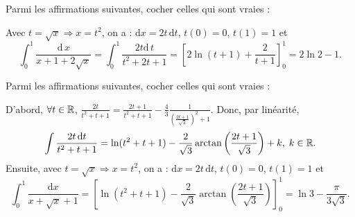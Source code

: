 \begin{question}
Parmi les affirmations suivantes, cocher celles qui sont vraies :
\begin{answers}
\bad{$\displaystyle \ln (t+1)+\frac{1}{t+1}$ est une primitive de $\displaystyle \frac{2t}{t^2+2t+1}$ sur $]-1,+\infty[$.}
\end{answers}
\vskip3mm
\begin{explanations}
Avec $t=\sqrt{x}\Rightarrow x=t^2$, on a : $\mathrm{d}x=2t\, \mathrm{d}t$, $t(0)=0$, $t(1)=1$ et 
$$\displaystyle \int _0^1\frac{\mathrm{d}\, x}{x+1+2\sqrt{x}}=\int _0^1\frac{2t\mathrm{d}\, t}{t^2+2t+1}=\left[2\ln (t+1)+\frac{2}{t+1}\right]_{0}^1=2\ln 2-1.$$
\end{explanations}
\end{question}


\begin{question}
Parmi les affirmations suivantes, cocher celles qui sont vraies :
\begin{answers}
\end{answers}
\vskip3mm
\begin{explanations}
D'abord, $\forall t\in \mathbb{R}$, $\displaystyle \frac{2t}{t^2+t+1}=\frac{2t+1}{t^2+t+1}-\frac{4}{3}\frac{1}{\left(\frac{2t+1}{\sqrt{3}}\right)^2+1}$. Donc, par linéarité,
$$\int \frac{2t\, \mathrm{d}t}{t^2+t+1}=\ln (t^2+t+1)-\frac{2}{\sqrt{3}}\arctan \left(\frac{2t+1}{\sqrt{3}}\right)+k,\; k\in \mathbb{R}.$$
Ensuite, avec $t=\sqrt{x}\Rightarrow x=t^2$, on a : $\mathrm{d}x=2t\, \mathrm{d}t$, $t(0)=0$, $t(1)=1$ et 
$$\int _0^1\frac{\mathrm{d}x}{x+\sqrt{x}+1}=\left[\ln (t^2+t+1)-\frac{2}{\sqrt{3}}\arctan \left(\frac{2t+1}{\sqrt{3}}\right)\right]_0^1=\ln 3-\frac{\pi}{3\sqrt{3}}.$$
\end{explanations}
\end{question}

